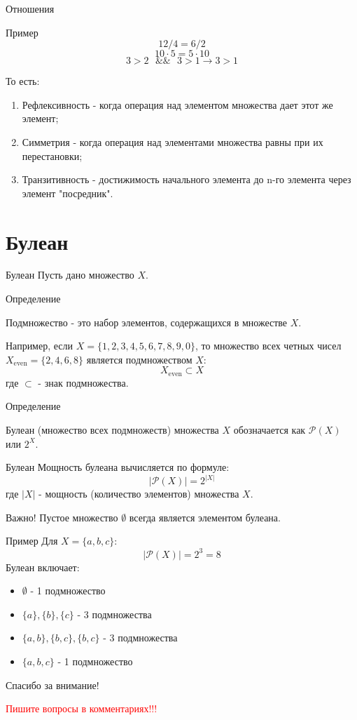 \documentclass{beamer}
\newenvironment{rusdefinition}[1][Определение]{
    \begin{block}{#1}
}{\end{block}}
\newenvironment{rexample}[1][Пример]{\begin{exampleblock}{#1}}{\end{exampleblock}}
\begin{document}
\begin{frame}{Отношения}
    \begin{rexample}    
    \[ 12/4 = 6/2 \] 
    \[ 10 \cdot 5 = 5 \cdot 10 \]
    \[ 3 > 2 \texttt{ } \&\& \texttt{ } 3 > 1 \rightarrow 3 > 1 \] 
\end{rexample}
То есть:
\begin{enumerate}
    \item Рефлексивность - когда операция над элементом множества дает этот же элемент;
    \item Симметрия - когда операция над элементами множества равны при их перестановки;
    \item Транзитивность - достижимость начального элемента до n-го элемента через элемент "посредник".
\end{enumerate}
\end{frame}

\section{Булеан}

\begin{frame}{Булеан}
    Пусть дано множество $X$. 

    \begin{rusdefinition}
        Подмножество - это набор элементов, содержащихся в множестве $X$. 
    \end{rusdefinition}

    Например, если $X = \{1,2,3,4,5,6,7,8,9,0\}$, то множество всех четных чисел 
    $X_{\text{even}} = \{2,4,6,8\}$ является подмножеством $X$:
    \[ X_{\text{even}} \subset X \]
    где $\subset$ - знак подмножества.

    \begin{rusdefinition}
        Булеан (множество всех подмножеств) множества $X$ обозначается как $\mathcal{P}(X)$ или $2^X$.
    \end{rusdefinition}
\end{frame}

\begin{frame}{Булеан}
    Мощность булеана вычисляется по формуле:
    \[ |\mathcal{P}(X)| = 2^{|X|} \]
    где $|X|$ - мощность (количество элементов) множества $X$.

    \alert{Важно! Пустое множество $\emptyset$ всегда является элементом булеана.}
\begin{rexample}    
        Для $X = \{a,b,c\}$:
        \[ |\mathcal{P}(X)| = 2^3 = 8 \]
        Булеан включает:
        \begin{itemize}
            \item $\emptyset$ - 1 подмножество
            \item $\{a\}, \{b\}, \{c\}$ - 3 подмножества
            \item $\{a,b\}, \{b,c\}, \{b,c\}$ - 3 подмножества 
            \item $\{a,b,c\}$ - 1 подмножество
        \end{itemize}
    \end{rexample}
\end{frame}

\begin{frame}{}
    \centering
    \Large Спасибо за внимание!
    
    \vspace{1cm}
    \small \textcolor{red}{Пишите вопросы в комментариях!!!}
\end{frame}
\end{document}
